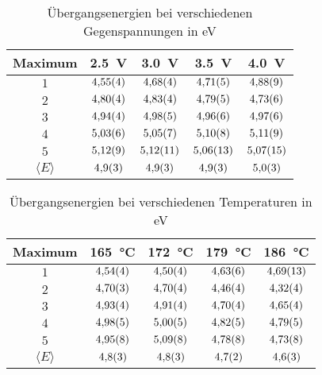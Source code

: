 \begin{table}[htb]
   \centering
\caption{Übergangsenergien bei verschiedenen Gegenspannungen in eV}
\begin{tabular}{c c c c c}
\hline Maximum & \SI{2.5}{\volt} & \SI{3.0}{\volt} & \SI{3.5}{\volt} & \SI{4.0}{\volt} \\ 
\hline
$\num{1}$ & $\num{4.55\pm 0.04}$ & $\num{4.68\pm 0.04}$ & $\num{4.71\pm 0.05}$ & $\num{4.88\pm 0.09}$ \\
$\num{2}$ & $\num{4.80\pm 0.04}$ & $\num{4.83\pm 0.04}$ & $\num{4.79\pm 0.05}$ & $\num{4.73\pm 0.06}$ \\
$\num{3}$ & $\num{4.94\pm 0.04}$ & $\num{4.98\pm 0.05}$ & $\num{4.96\pm 0.06}$ & $\num{4.97\pm 0.06}$ \\
$\num{4}$ & $\num{5.03\pm 0.06}$ & $\num{5.05\pm 0.07}$ & $\num{5.10\pm 0.08}$ & $\num{5.11\pm 0.09}$ \\
$\num{5}$ & $\num{5.12\pm 0.09}$ & $\num{5.12\pm 0.11}$ & $\num{5.06\pm 0.13}$ & $\num{5.07\pm 0.15}$ \\
$\langle E\rangle$ & $\num{4.9\pm 0.3}$ & $\num{4.9\pm 0.3}$ & $\num{4.9\pm 0.3}$ & $\num{5.0\pm 0.3}$ \\
\hline\end{tabular}
\label{fig:energy_gegen}
\end{table}\begin{table}[htb]
   \centering
\caption{Übergangsenergien bei verschiedenen Temperaturen in eV}
\begin{tabular}{c c c c c}
\hline Maximum & \SI{165}{\celsius} & \SI{172}{\celsius} & \SI{179}{\celsius} & \SI{186}{\celsius} \\ 
\hline
$\num{1}$ & $\num{4.54\pm 0.04}$ & $\num{4.50\pm 0.04}$ & $\num{4.63\pm 0.06}$ & $\num{4.69\pm 0.13}$ \\
$\num{2}$ & $\num{4.70\pm 0.03}$ & $\num{4.70\pm 0.04}$ & $\num{4.46\pm 0.04}$ & $\num{4.32\pm 0.04}$ \\
$\num{3}$ & $\num{4.93\pm 0.04}$ & $\num{4.91\pm 0.04}$ & $\num{4.70\pm 0.04}$ & $\num{4.65\pm 0.04}$ \\
$\num{4}$ & $\num{4.98\pm 0.05}$ & $\num{5.00\pm 0.05}$ & $\num{4.82\pm 0.05}$ & $\num{4.79\pm 0.05}$ \\
$\num{5}$ & $\num{4.95\pm 0.08}$ & $\num{5.09\pm 0.08}$ & $\num{4.78\pm 0.08}$ & $\num{4.73\pm 0.08}$ \\
$\langle E\rangle$ & $\num{4.8\pm 0.3}$ & $\num{4.8\pm 0.3}$ & $\num{4.7\pm 0.2}$ & $\num{4.6\pm 0.3}$ \\
\hline\end{tabular}
\label{fig:energy_temp}
\end{table}